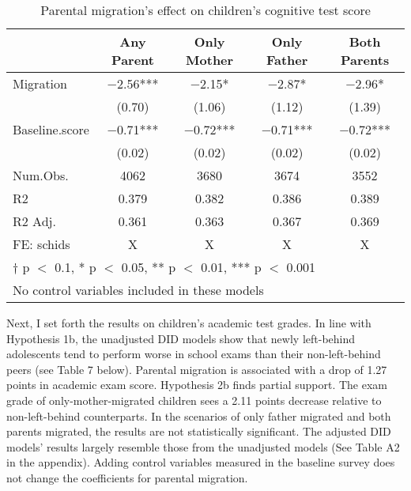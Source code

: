 \documentclass[
  man,floatsintext]{apa7}
\begin{document}
\begin{table}

\caption{Parental migration’s effect on children’s cognitive test score}
\centering
\begin{tabular}[t]{lcccc}
\toprule
  & Any Parent & Only Mother & Only Father & Both Parents\\
\midrule
Migration & \num{-2.56}*** & \num{-2.15}* & \num{-2.87}* & \num{-2.96}*\\
 & (\num{0.70}) & (\num{1.06}) & (\num{1.12}) & (\num{1.39})\\
Baseline.score & \num{-0.71}*** & \num{-0.72}*** & \num{-0.71}*** & \num{-0.72}***\\
 & (\num{0.02}) & (\num{0.02}) & (\num{0.02}) & (\num{0.02})\\
\midrule
Num.Obs. & \num{4062} & \num{3680} & \num{3674} & \num{3552}\\
R2 & \num{0.379} & \num{0.382} & \num{0.386} & \num{0.389}\\
R2 Adj. & \num{0.361} & \num{0.363} & \num{0.367} & \num{0.369}\\
FE: schids & X & X & X & X\\
\bottomrule
\multicolumn{5}{l}{\rule{0pt}{1em}† p $<$ 0.1, * p $<$ 0.05, ** p $<$ 0.01, *** p $<$ 0.001}\\
\multicolumn{5}{l}{\rule{0pt}{1em}No control variables included in these models}\\
\end{tabular}
\end{table}

Next, I set forth the results on children's academic test grades. In line with Hypothesis 1b, the unadjusted DID models show that newly left-behind adolescents tend to perform worse in school exams than their non-left-behind peers (see Table 7 below). Parental migration is associated with a drop of 1.27 points in academic exam score. Hypothesis 2b finds partial support. The exam grade of only-mother-migrated children sees a 2.11 points decrease relative to non-left-behind counterparts. In the scenarios of only father migrated and both parents migrated, the results are not statistically significant. The adjusted DID models' results largely resemble those from the unadjusted models (See Table A2 in the appendix). Adding control variables measured in the baseline survey does not change the coefficients for parental migration.

\newpage
\end{document}
